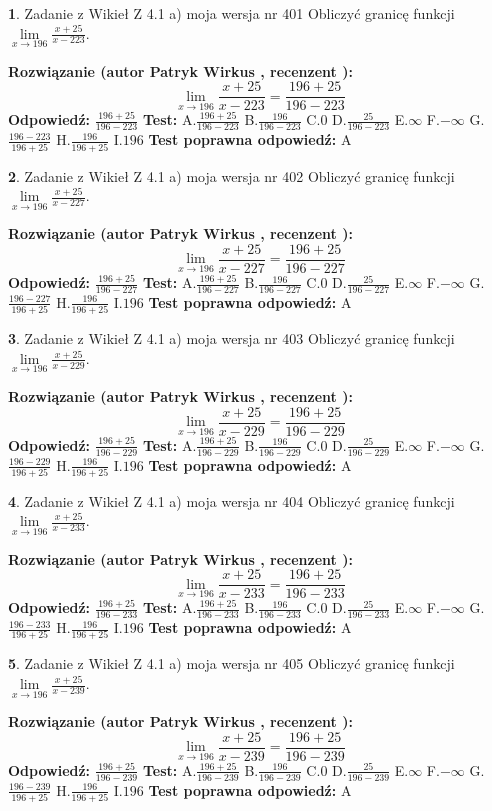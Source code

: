 \documentclass[12pt, a4paper]{article}
\theoremstyle{definition} %
\newtheorem{zad}{}
\newcommand{\zadStart}[1]{\begin{zad}#1\newline}
\newcommand{\zadStop}{\end{zad}}
\newcommand{\rozwStart}[2]{\noindent \textbf{Rozwiązanie (autor #1 , recenzent #2): }\newline}
\newcommand{\rozwStop}{\newline}
\newcommand{\odpStart}{\noindent \textbf{Odpowiedź:}\newline}
\newcommand{\odpStop}{\newline}
\newcommand{\testStart}{\noindent \textbf{Test:}\newline}
\newcommand{\testStop}{\newline}
\newcommand{\kluczStart}{\noindent \textbf{Test poprawna odpowiedź:}\newline}
\newcommand{\kluczStop}{\newline}
\begin{document}
\zadStart{Zadanie z Wikieł Z 4.1 a) moja wersja nr 401}
Obliczyć granicę funkcji $\lim\limits_{x\to196}\frac{x+25}{x-223}$.
\zadStop
\rozwStart{Patryk Wirkus}{}
$$\lim\limits_{x\to196}\frac{x+25}{x-223} = \frac{196+25}{196-223}$$
\rozwStop
\odpStart
$\frac{196+25}{196-223}$
\odpStop
\testStart
A.$\frac{196+25}{196-223}$
B.$\frac{196}{196-223}$
C.$0$
D.$\frac{25}{196-223}$
E.$\infty$
F.$-\infty$
G.$\frac{196-223}{196+25}$
H.$\frac{196}{196+25}$
I.$196$
\testStop
\kluczStart
A
\kluczStop



\zadStart{Zadanie z Wikieł Z 4.1 a) moja wersja nr 402}
Obliczyć granicę funkcji $\lim\limits_{x\to196}\frac{x+25}{x-227}$.
\zadStop
\rozwStart{Patryk Wirkus}{}
$$\lim\limits_{x\to196}\frac{x+25}{x-227} = \frac{196+25}{196-227}$$
\rozwStop
\odpStart
$\frac{196+25}{196-227}$
\odpStop
\testStart
A.$\frac{196+25}{196-227}$
B.$\frac{196}{196-227}$
C.$0$
D.$\frac{25}{196-227}$
E.$\infty$
F.$-\infty$
G.$\frac{196-227}{196+25}$
H.$\frac{196}{196+25}$
I.$196$
\testStop
\kluczStart
A
\kluczStop



\zadStart{Zadanie z Wikieł Z 4.1 a) moja wersja nr 403}
Obliczyć granicę funkcji $\lim\limits_{x\to196}\frac{x+25}{x-229}$.
\zadStop
\rozwStart{Patryk Wirkus}{}
$$\lim\limits_{x\to196}\frac{x+25}{x-229} = \frac{196+25}{196-229}$$
\rozwStop
\odpStart
$\frac{196+25}{196-229}$
\odpStop
\testStart
A.$\frac{196+25}{196-229}$
B.$\frac{196}{196-229}$
C.$0$
D.$\frac{25}{196-229}$
E.$\infty$
F.$-\infty$
G.$\frac{196-229}{196+25}$
H.$\frac{196}{196+25}$
I.$196$
\testStop
\kluczStart
A
\kluczStop



\zadStart{Zadanie z Wikieł Z 4.1 a) moja wersja nr 404}
Obliczyć granicę funkcji $\lim\limits_{x\to196}\frac{x+25}{x-233}$.
\zadStop
\rozwStart{Patryk Wirkus}{}
$$\lim\limits_{x\to196}\frac{x+25}{x-233} = \frac{196+25}{196-233}$$
\rozwStop
\odpStart
$\frac{196+25}{196-233}$
\odpStop
\testStart
A.$\frac{196+25}{196-233}$
B.$\frac{196}{196-233}$
C.$0$
D.$\frac{25}{196-233}$
E.$\infty$
F.$-\infty$
G.$\frac{196-233}{196+25}$
H.$\frac{196}{196+25}$
I.$196$
\testStop
\kluczStart
A
\kluczStop



\zadStart{Zadanie z Wikieł Z 4.1 a) moja wersja nr 405}
Obliczyć granicę funkcji $\lim\limits_{x\to196}\frac{x+25}{x-239}$.
\zadStop
\rozwStart{Patryk Wirkus}{}
$$\lim\limits_{x\to196}\frac{x+25}{x-239} = \frac{196+25}{196-239}$$
\rozwStop
\odpStart
$\frac{196+25}{196-239}$
\odpStop
\testStart
A.$\frac{196+25}{196-239}$
B.$\frac{196}{196-239}$
C.$0$
D.$\frac{25}{196-239}$
E.$\infty$
F.$-\infty$
G.$\frac{196-239}{196+25}$
H.$\frac{196}{196+25}$
I.$196$
\testStop
\kluczStart
A
\kluczStop
\end{document}
